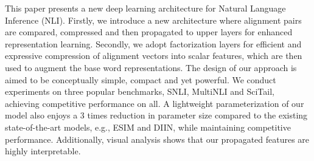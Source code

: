 This paper presents a new deep learning architecture for Natural Language Inference (NLI). Firstly, we introduce a new architecture where alignment pairs are compared, compressed and then propagated to upper layers for enhanced representation learning. Secondly, we adopt factorization layers for efficient and expressive compression of alignment vectors into scalar features, which are then used to augment the base word representations. The design of our approach is aimed to be conceptually simple, compact and yet powerful. We conduct experiments on three popular benchmarks, SNLI, MultiNLI and SciTail, achieving competitive performance on all. A lightweight parameterization of our model also enjoys a 3 times reduction in parameter size compared to the existing state-of-the-art models, e.g., ESIM and DIIN, while maintaining competitive performance. Additionally, visual analysis shows that our propagated features are highly interpretable.
